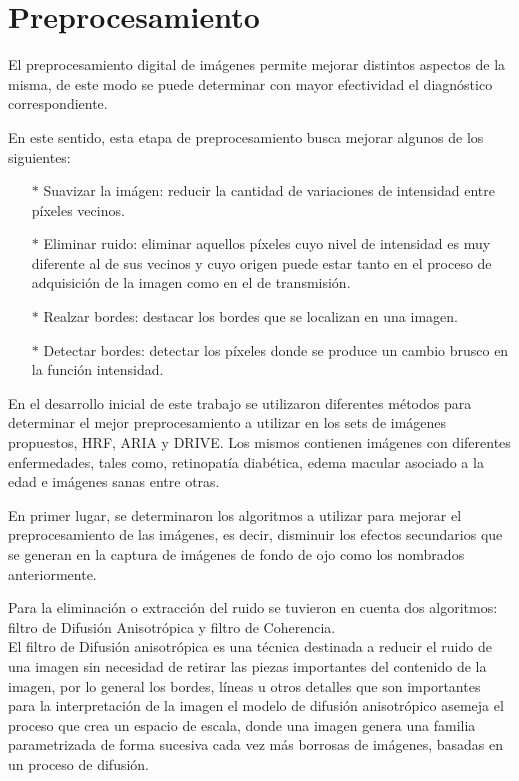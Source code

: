 \section{Preprocesamiento}

El preprocesamiento digital de im\'agenes permite mejorar distintos aspectos de la misma, de este modo se puede determinar con mayor efectividad el diagn\'ostico correspondiente.

En este sentido, esta etapa de preprocesamiento busca mejorar algunos de los siguientes:

\begin{itemize}
	\item[$*$] Suavizar la im\'agen:  reducir la cantidad de variaciones de intensidad entre píxeles vecinos.					\item[$*$] Eliminar ruido: eliminar aquellos píxeles cuyo nivel de intensidad es muy diferente al de sus vecinos y cuyo origen puede estar tanto en el proceso de adquisición de la imagen como en el de transmisión.
	\item[$*$] Realzar bordes: destacar los bordes que se localizan en una imagen.
	\item[$*$] Detectar bordes: detectar los píxeles donde se produce un cambio brusco en la función intensidad.
\end{itemize}

En el desarrollo inicial de este trabajo se utilizaron diferentes m\'etodos para determinar el mejor preprocesamiento a utilizar en los sets de im\'agenes propuestos, HRF, ARIA y DRIVE. Los mismos contienen im\'agenes con diferentes enfermedades, tales como, retinopat\'ia diab\'etica, edema macular asociado a la edad e im\'agenes sanas entre otras. 

En primer lugar, se determinaron los algoritmos a utilizar para mejorar el preprocesamiento de las im\'agenes, es decir, disminuir los efectos secundarios que se generan en la captura de im\'agenes de fondo de ojo como los nombrados anteriormente. 

Para la eliminaci\'on o extracci\'on del ruido se tuvieron en cuenta dos algoritmos: filtro de Difusi\'on Anisotr\'opica y filtro de  Coherencia.\\

El filtro de Difusi\'on anisotr\'opica es una técnica destinada a reducir el ruido de una imagen sin necesidad de retirar las piezas importantes del contenido de la imagen, por lo general los bordes, líneas u otros detalles que son importantes para la interpretación de la imagen el modelo de difusión anisotrópico asemeja el proceso que crea un espacio de escala, donde una imagen genera una familia parametrizada de forma sucesiva cada vez más borrosas de imágenes, basadas en un proceso de difusión.\\

